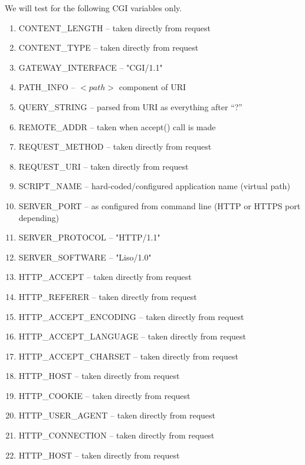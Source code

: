\label{sec:cgi-vars}

We will test for the following CGI variables only.
\begin{enumerate}
\item CONTENT\_LENGTH -- taken directly from request
\item CONTENT\_TYPE -- taken directly from request
\item GATEWAY\_INTERFACE -- "CGI/1.1"
\item PATH\_INFO -- $<path>$ component of URI
\item QUERY\_STRING -- parsed from URI as everything after ``?''
\item REMOTE\_ADDR -- taken when accept() call is made
\item REQUEST\_METHOD -- taken directly from request
\item REQUEST\_URI -- taken directly from request
\item SCRIPT\_NAME -- hard-coded/configured application name (virtual path) 
\item SERVER\_PORT -- as configured from command line (HTTP or HTTPS port depending)
\item SERVER\_PROTOCOL -- "HTTP/1.1"
\item SERVER\_SOFTWARE -- "Liso/1.0"
\item HTTP\_ACCEPT -- taken directly from request
\item HTTP\_REFERER -- taken directly from request
\item HTTP\_ACCEPT\_ENCODING -- taken directly from request
\item HTTP\_ACCEPT\_LANGUAGE -- taken directly from request
\item HTTP\_ACCEPT\_CHARSET -- taken directly from request
\item HTTP\_HOST -- taken directly from request
\item HTTP\_COOKIE -- taken directly from request
\item HTTP\_USER\_AGENT -- taken directly from request
\item HTTP\_CONNECTION -- taken directly from request
\item HTTP\_HOST -- taken directly from request
\end{enumerate}

